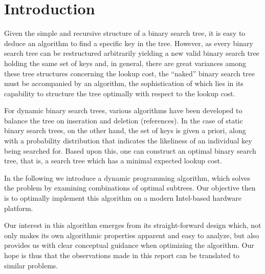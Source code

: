 
\section{Introduction}\label{sec:intro}
Given the simple and recursive structure of a binary search tree, it is easy to
deduce an algorithm to find a specific key in the tree. However, as every binary
search tree can be restructured arbitrarily yielding a new valid binary search
tree holding the same set of keys and, in general, there are great variances
among these tree structures concerning the lookup cost, the ``naked''
binary search tree must be accompanied by an algorithm, the sophistication of
which lies in its capability to structure the tree optimally with respect to the
lookup cost.

For dynamic binary search trees, various algorithms have been developed to
balance the tree on inseration and deletion (references). In the case of static
binary search trees, on the other hand, the set of keys is given a priori, along
with a probability distribution that indicates the likeliness of an individual
key being searched for. Based upon this, one can construct an optimal binary
search tree, that is, a search tree which has a minimal expected lookup cost.

In the following we introduce a dynamic programming algorithm, which solves the
problem by examining combinations of optimal subtrees. Our objective then is to
optimally implement this algorithm on a modern Intel-based hardware platform.

Our interest in this algorithm emerges from its straight-forward design which,
not only makes its own algorithmic properties apparent and easy to analyze, but
also provides us with clear conceptual guidance when optimizing the algorithm.
Our hope is thus that the observations made in this report can be translated to
similar problems.
